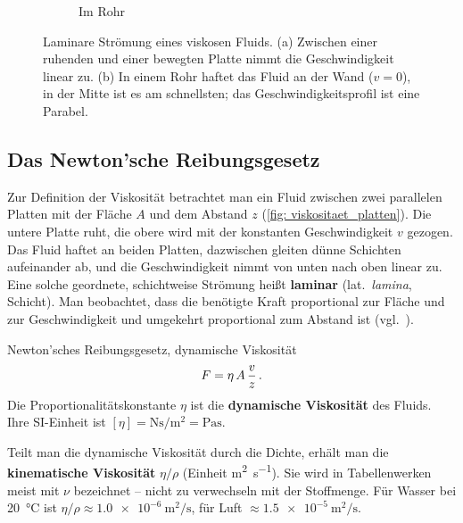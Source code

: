 \begin{figure}[htb]
\begin{subfigure}[b]{0.46\textwidth}
        \caption{Im Rohr}\label{fig: viskositaet_rohr}
    \end{subfigure}
    \caption{Laminare Strömung eines viskosen Fluids. (a) Zwischen einer ruhenden und einer bewegten Platte nimmt die Geschwindigkeit linear zu. (b) In einem Rohr haftet das Fluid an der Wand ($v = 0$), in der Mitte ist es am schnellsten; das Geschwindigkeitsprofil ist eine Parabel.}\label{fig: viskositaet_profile}
\end{figure}

\subsection{Das Newton'sche Reibungsgesetz}
Zur Definition der Viskosität betrachtet man ein Fluid zwischen zwei parallelen Platten mit der Fläche $A$ und dem Abstand $z$ (\cref{fig: viskositaet_platten}). Die untere Platte ruht, die obere wird mit der konstanten Geschwindigkeit $v$ gezogen. Das Fluid haftet an beiden Platten, dazwischen gleiten dünne Schichten aufeinander ab, und die Geschwindigkeit nimmt von unten nach oben linear zu. Eine solche geordnete, schichtweise Strömung heißt \textbf{laminar} (lat.~\textit{lamina}, Schicht). Man beobachtet, dass die benötigte Kraft proportional zur Fläche und zur Geschwindigkeit und umgekehrt proportional zum Abstand ist (vgl.~\cite[S.~396]{Tipler2015}).

\begin{rememberbox}{Newton'sches Reibungsgesetz, dynamische Viskosität}
    \begin{equation}\label{eq: newton_reibungsgesetz}
        F = \eta \, A \, \frac{v}{z} \,.
    \end{equation}
    Die Proportionalitätskonstante $\eta$ ist die \textbf{dynamische Viskosität} des Fluids. Ihre SI-Einheit ist $[\eta] = \si{\newton\second\per\meter\squared} = \si{\pascal\second}$.
\end{rememberbox}
Teilt man die dynamische Viskosität durch die Dichte, erhält man die \textbf{kinematische Viskosität} $\eta/\rho$ (Einheit \si{\meter\squared\per\second}). Sie wird in Tabellenwerken meist mit $\nu$ bezeichnet -- nicht zu verwechseln mit der Stoffmenge. Für Wasser bei \SI{20}{\celsius} ist $\eta/\rho \approx \SI{1.0e-6}{\meter\squared\per\second}$, für Luft $\approx \SI{1.5e-5}{\meter\squared\per\second}$.

